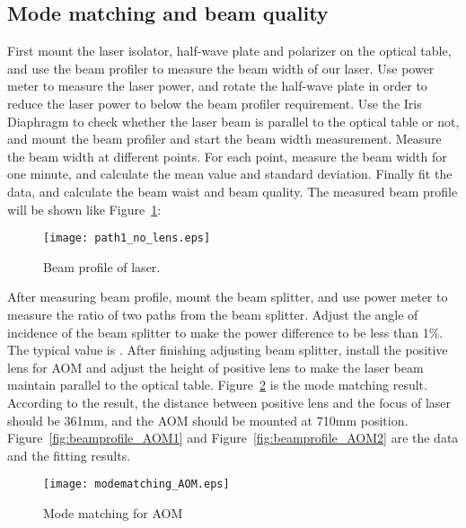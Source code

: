 \subsection{Mode matching and beam quality}
First mount the laser isolator, half-wave plate and polarizer on the optical table, and use the \underline{\qquad\qquad} beam profiler to measure the beam width of our laser. Use power meter to measure the laser power, and rotate the half-wave plate in order to reduce the laser power to below the beam profiler requirement. Use the Iris Diaphragm to check whether the laser beam is parallel to the optical table or not, and mount the beam profiler and start the beam width measurement. Measure the beam width at different points. For each point, measure the beam width for one minute, and calculate the mean value and standard deviation. Finally fit the data, and calculate the beam waist and beam quality. The measured beam profile will be shown like Figure~\ref{fig:beam_profile}:

\begin{figure}
	\begin{center}
		\texttt{[image: path1\_no\_lens.eps]}
		\caption{Beam profile of laser.} 
		\label{fig:beam_profile} 
	\end{center}
\end{figure}

After measuring beam profile, mount the beam splitter, and use power meter to measure the ratio of two paths from the beam splitter. Adjust the angle of incidence of the beam splitter to make the power difference to be less than 1$\%$. The typical value is \underline{\qquad\qquad}. After finishing adjusting beam splitter, install the positive lens for AOM and adjust the height of positive lens to make the laser beam maintain parallel to the optical table. Figure~\ref{fig:modematching_AOM} is the mode matching result. According to the result, the distance between positive lens and the focus of laser should be 361mm, and the AOM should be mounted at 710mm position. Figure~\ref{fig:beamprofile_AOM1} and Figure~\ref{fig:beamprofile_AOM2} are the data and the fitting results.

\begin{figure}
	\begin{center}
		\texttt{[image: modematching\_AOM.eps]}
		\caption{Mode matching for AOM} 
		\label{fig:modematching_AOM} 
	\end{center}
\end{figure}

